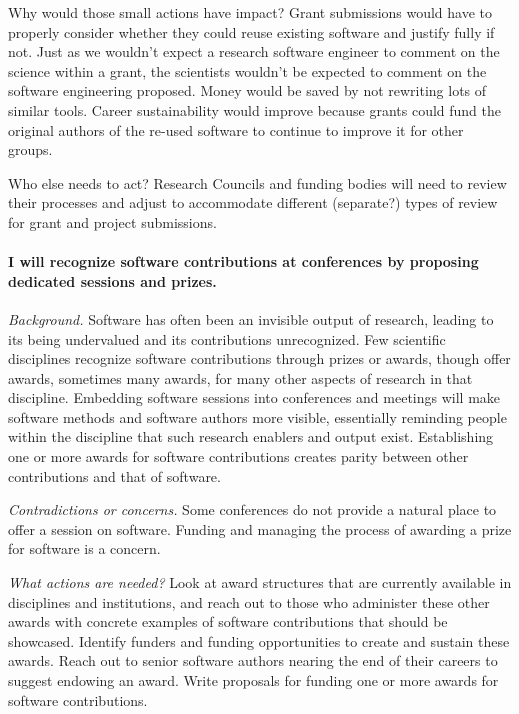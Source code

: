Why would those small actions have impact?
Grant submissions would have to properly consider whether they could reuse existing software and justify fully if not.
Just as we wouldn't expect a research software engineer to comment on the science within a grant, the scientists wouldn't be expected to comment on the software engineering proposed.
Money would be saved by not rewriting lots of similar tools.
Career sustainability would improve because grants could fund the original authors of the re-used software to continue to improve it for other groups.

Who else needs to act?
Research Councils and funding bodies will need to review their processes and adjust to accommodate different (separate?) types of review for grant and project submissions.


\paragraph{I will recognize software contributions at conferences by proposing dedicated sessions and prizes.}

\emph{Background.} Software has often been an invisible output of research, leading to its being undervalued and its contributions unrecognized.
Few scientific disciplines recognize software contributions through prizes or awards, though offer awards, sometimes many awards, for many other aspects of research in that discipline.
Embedding software sessions into conferences and meetings will make software methods and software authors more visible, essentially reminding people within the discipline that such research enablers and output exist.
Establishing one or more awards for software contributions creates parity between other contributions and that of software.

\emph{Contradictions or concerns.} Some conferences do not provide a natural place to offer a session on software. 
Funding and managing the process of awarding a prize for software is a concern. 

\emph{What actions are needed?}
Look at award structures that are currently available in disciplines and institutions, and reach out to those who administer these other awards with concrete examples of software contributions that should be showcased. Identify funders and funding opportunities to create and sustain these awards. Reach out to senior software authors nearing the end of their careers to suggest endowing an award. Write proposals for funding one or more awards for software contributions.

